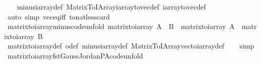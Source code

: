 \begin{isabellebody}
%
\isadelimproof
\ \ %
\endisadelimproof
%
\isatagproof
{}\isamarkupfalse%
\ minus{\isacharunderscore}{\kern0pt}iarray{\isacharunderscore}{\kern0pt}def\ Matrix{\isacharunderscore}{\kern0pt}To{\isacharunderscore}{\kern0pt}IArray{\isachardot}{\kern0pt}iarray{\isacharunderscore}{\kern0pt}to{\isacharunderscore}{\kern0pt}vec{\isacharunderscore}{\kern0pt}def\ iarray{\isacharunderscore}{\kern0pt}to{\isacharunderscore}{\kern0pt}vec{\isacharunderscore}{\kern0pt}def\isanewline
\ \ \isamarkupfalse%
\ {\isacharparenleft}{\kern0pt}auto\ simp{\isacharcolon}{\kern0pt}\ vec{\isacharunderscore}{\kern0pt}eq{\isacharunderscore}{\kern0pt}iff\ to{\isacharunderscore}{\kern0pt}nat{\isacharunderscore}{\kern0pt}less{\isacharunderscore}{\kern0pt}card{\isacharparenright}{\kern0pt}%
\endisatagproof
{\isafoldproof}%
%
\isadelimproof
\isanewline
%
\endisadelimproof
\isanewline
{}\isamarkupfalse%
\ matrix{\isacharunderscore}{\kern0pt}to{\isacharunderscore}{\kern0pt}iarray{\isacharunderscore}{\kern0pt}minus{\isacharbrackleft}{\kern0pt}code{\isacharunderscore}{\kern0pt}unfold{\isacharbrackright}{\kern0pt}{\isacharcolon}{\kern0pt}\ {\isachardoublequoteopen}matrix{\isacharunderscore}{\kern0pt}to{\isacharunderscore}{\kern0pt}iarray\ {\isacharparenleft}{\kern0pt}A\ {\isacharminus}{\kern0pt}\ B{\isacharparenright}{\kern0pt}\ {\isacharequal}{\kern0pt}\ matrix{\isacharunderscore}{\kern0pt}to{\isacharunderscore}{\kern0pt}iarray\ A\ {\isacharminus}{\kern0pt}\ matrix{\isacharunderscore}{\kern0pt}to{\isacharunderscore}{\kern0pt}iarray\ B{\isachardoublequoteclose}\isanewline
%
\isadelimproof
\ \ %
\endisadelimproof
%
\isatagproof
{}\isamarkupfalse%
\ matrix{\isacharunderscore}{\kern0pt}to{\isacharunderscore}{\kern0pt}iarray{\isacharunderscore}{\kern0pt}def\ o{\isacharunderscore}{\kern0pt}def\ minus{\isacharunderscore}{\kern0pt}iarray{\isacharunderscore}{\kern0pt}def\ Matrix{\isacharunderscore}{\kern0pt}To{\isacharunderscore}{\kern0pt}IArray{\isachardot}{\kern0pt}vec{\isacharunderscore}{\kern0pt}to{\isacharunderscore}{\kern0pt}iarray{\isacharunderscore}{\kern0pt}def\isanewline
\ \ \isamarkupfalse%
\ simp%
\endisatagproof
{\isafoldproof}%
%
\isadelimproof
\isanewline
%
\endisadelimproof
\isanewline
{}\isamarkupfalse%
\ matrix{\isacharunderscore}{\kern0pt}to{\isacharunderscore}{\kern0pt}iarray{\isacharunderscore}{\kern0pt}fst{\isacharunderscore}{\kern0pt}Gauss{\isacharunderscore}{\kern0pt}Jordan{\isacharunderscore}{\kern0pt}PA{\isacharbrackleft}{\kern0pt}code{\isacharunderscore}{\kern0pt}unfold{\isacharbrackright}{\kern0pt}\ \isanewline
%
\isadelimtheory
\isanewline
%
\endisadelimtheory
%
\isatagtheory
{}\isamarkupfalse%
%
\endisatagtheory
{\isafoldtheory}%
%
\isadelimtheory
%
\endisadelimtheory
%
\end{isabellebody}%
